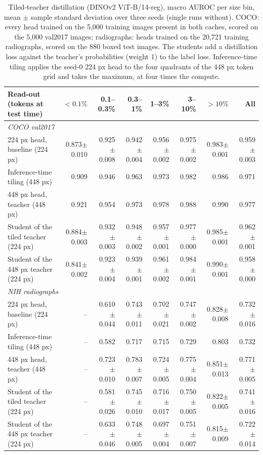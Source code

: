 \documentclass[10pt,letterpaper,twocolumn]{article}
\begin{document}
\begin{table}[t]
\centering\footnotesize\setlength{\tabcolsep}{4pt}
\caption{Tiled-teacher distillation (DINOv2 ViT-B/14-reg), macro AUROC per size bin, mean
$\pm$ sample standard deviation over three seeds (single runs without). COCO: every head
trained on the 5,000 training images present in both caches, scored on the 5,000 val2017
images; radiographs: heads trained on the 20,721 training radiographs, scored on the 880
boxed test images. The students add a distillation loss against the teacher's probabilities
(weight 1) to the label loss. Inference-time tiling applies the seed-0 224 px head to the
four quadrants of the 448 px token grid and takes the maximum, at four times the compute.}
\label{tab:distill}
\begin{tabular}{lrrrrrrr}
\toprule
Read-out (tokens at test time) & $<0.1\%$ & 0.1--0.3\% & 0.3--1\% & 1--3\% & 3--10\% & $>10\%$ & All \\
\midrule
\multicolumn{8}{l}{\emph{COCO val2017}} \\
224 px head, baseline (224 px) & 0.873$\pm$0.010 & 0.925$\pm$0.008 & 0.942$\pm$0.004 & 0.956$\pm$0.002 & 0.975$\pm$0.002 & 0.983$\pm$0.001 & 0.959$\pm$0.003 \\
Inference-time tiling (448 px) & 0.909 & 0.946 & 0.963 & 0.973 & 0.982 & 0.986 & 0.971 \\
448 px head, teacher (448 px) & 0.921 & 0.954 & 0.973 & 0.978 & 0.988 & 0.990 & 0.977 \\
Student of the tiled teacher (224 px) & 0.884$\pm$0.003 & 0.932$\pm$0.003 & 0.948$\pm$0.002 & 0.957$\pm$0.001 & 0.977$\pm$0.000 & 0.985$\pm$0.001 & 0.962$\pm$0.001 \\
Student of the 448 px teacher (224 px) & 0.841$\pm$0.002 & 0.923$\pm$0.004 & 0.939$\pm$0.001 & 0.961$\pm$0.002 & 0.984$\pm$0.001 & 0.990$\pm$0.001 & 0.958$\pm$0.000 \\
\midrule
\multicolumn{8}{l}{\emph{NIH radiographs}} \\
224 px head, baseline (224 px) & -- & 0.610$\pm$0.044 & 0.743$\pm$0.011 & 0.702$\pm$0.021 & 0.747$\pm$0.002 & 0.828$\pm$0.008 & 0.732$\pm$0.016 \\
Inference-time tiling (448 px) & -- & 0.582 & 0.717 & 0.715 & 0.729 & 0.803 & 0.732 \\
448 px head, teacher (448 px) & -- & 0.723$\pm$0.010 & 0.783$\pm$0.007 & 0.724$\pm$0.005 & 0.775$\pm$0.004 & 0.851$\pm$0.013 & 0.771$\pm$0.005 \\
Student of the tiled teacher (224 px) & -- & 0.581$\pm$0.026 & 0.745$\pm$0.010 & 0.716$\pm$0.017 & 0.750$\pm$0.005 & 0.822$\pm$0.005 & 0.741$\pm$0.016 \\
Student of the 448 px teacher (224 px) & -- & 0.633$\pm$0.046 & 0.748$\pm$0.005 & 0.697$\pm$0.004 & 0.751$\pm$0.007 & 0.815$\pm$0.009 & 0.722$\pm$0.014 \\
\bottomrule
\end{tabular}
\end{table}
\end{document}
